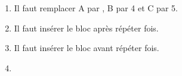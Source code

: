 \documentclass[10pt]{article}
\begin{document}
\begin{enumerate}
	\begin{enumerate}
		\item %
Il faut remplacer A par , B par 4 et C par 5.
		\item %
Il faut insérer le bloc après répéter  fois.
		\item %
Il faut insérer le bloc avant répéter  fois.
		\item %
		


\end{enumerate}
\end{enumerate}
\end{document}
